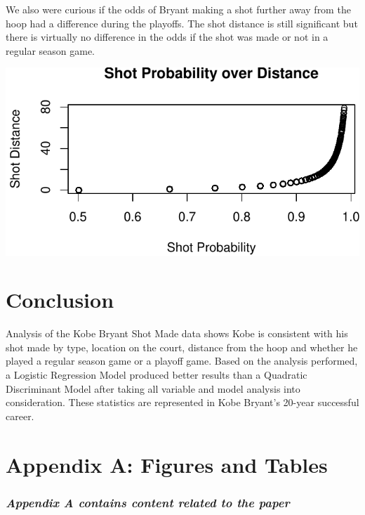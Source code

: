\documentclass[american,]{article}
\begin{document}
We also were curious if the odds of Bryant making a shot further away from the hoop had a difference during the playoffs. The shot distance is still significant but there is virtually no difference in the odds if the shot was made or not in a regular season game.

\begin{center}\includegraphics{Final_Project_Applied_files/figure-latex/Probabilities-1} \end{center}

\hypertarget{conclusion}{%
\section{\texorpdfstring{\textbf{Conclusion}}{Conclusion}}\label{conclusion}}

Analysis of the Kobe Bryant Shot Made data shows Kobe is consistent with his shot made by type, location on the court, distance from the hoop and whether he played a regular season game or a playoff game. Based on the analysis performed, a Logistic Regression Model produced better results than a Quadratic Discriminant Model after taking all variable and model analysis into consideration. These statistics are represented in Kobe Bryant's 20-year successful career.

\newpage

\hypertarget{appendix-a-figures-and-tables}{%
\section{Appendix A: Figures and Tables}\label{appendix-a-figures-and-tables}}

\hypertarget{appendix-a-contains-content-related-to-the-paper}{%
\subsubsection{\texorpdfstring{\emph{Appendix A contains content related to the paper}}{Appendix A contains content related to the paper}}\label{appendix-a-contains-content-related-to-the-paper}}
\end{document}
